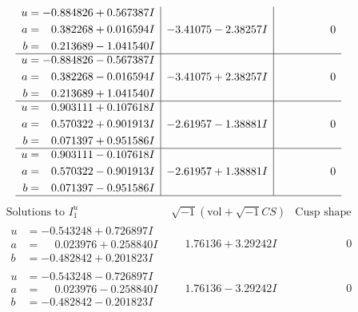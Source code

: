 \documentclass[1p]{elsarticle_modified}
\theoremstyle{definition}
\newcommand{\I}{\sqrt{-1}}
\begin{document}
$$\begin{array}{c|c|c}
\begin{aligned}
u &= -0.884826 + 0.567387 I \\
a &= \phantom{-}0.382268 + 0.016594 I \\
b &= \phantom{-}0.213689 - 1.041540 I\end{aligned}
 & -3.41075 - 2.38257 I & \phantom{-0.000000 } 0 \\ \hline\begin{aligned}
u &= -0.884826 - 0.567387 I \\
a &= \phantom{-}0.382268 - 0.016594 I \\
b &= \phantom{-}0.213689 + 1.041540 I\end{aligned}
 & -3.41075 + 2.38257 I & \phantom{-0.000000 } 0 \\ \hline\begin{aligned}
u &= \phantom{-}0.903111 + 0.107618 I \\
a &= \phantom{-}0.570322 + 0.901913 I \\
b &= \phantom{-}0.071397 + 0.951586 I\end{aligned}
 & -2.61957 - 1.38881 I & \phantom{-0.000000 } 0 \\ \hline\begin{aligned}
u &= \phantom{-}0.903111 - 0.107618 I \\
a &= \phantom{-}0.570322 - 0.901913 I \\
b &= \phantom{-}0.071397 - 0.951586 I\end{aligned}
 & -2.61957 + 1.38881 I & \phantom{-0.000000 } 0\\
 \hline 
 \end{array}$$\newpage$$\begin{array}{c|c|c}  
\text{Solutions to }I^u_{1}& \I (\text{vol} + \sqrt{-1}CS) & \text{Cusp shape}\\
 \hline 
\begin{aligned}
u &= -0.543248 + 0.726897 I \\
a &= \phantom{-}0.023976 + 0.258840 I \\
b &= -0.482842 + 0.201823 I\end{aligned}
 & \phantom{-}1.76136 + 3.29242 I & \phantom{-0.000000 } 0 \\ \hline\begin{aligned}
u &= -0.543248 - 0.726897 I \\
a &= \phantom{-}0.023976 - 0.258840 I \\
b &= -0.482842 - 0.201823 I\end{aligned}
 & \phantom{-}1.76136 - 3.29242 I & \phantom{-0.000000 } 0 \\ \hline\begin{aligned}

\end{aligned}
\end{array}$$
\end{document}
